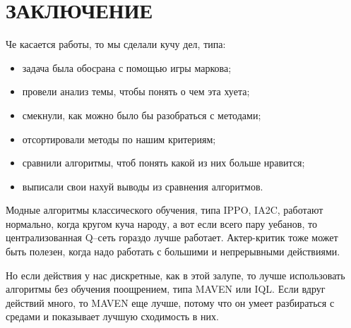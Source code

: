 \chapter*{\hfill{\centering ЗАКЛЮЧЕНИЕ }\hfill}
Че касается работы, то мы сделали кучу дел, типа:

\begin{itemize}[label=---]
\item задача была обосрана с помощью игры маркова;
\item провели анализ темы, чтобы понять о чем эта хуета;
\item смекнули, как можно было бы разобраться с методами;
\item отсортировали методы по нашим критериям;
\item сравнили алгоритмы, чтоб понять какой из них больше нравится;
\item выписали свои нахуй выводы из сравнения алгоритмов.
\end{itemize}

Модные алгоритмы классического обучения, типа IPPO, IA2C, работают нормально, когда кругом куча народу, а вот если всего пару уебанов, то централизованная Q--сеть гораздо лучше работает. Актер-критик тоже может быть полезен, когда надо работать с большими и непрерывными действиями.

Но если действия у нас дискретные, как в этой залупе, то лучше использовать алгоритмы без обучения поощрением, типа MAVEN или IQL. Если вдруг действий много, то MAVEN еще лучше, потому что он умеет разбираться с средами и показывает лучшую сходимость в них.

